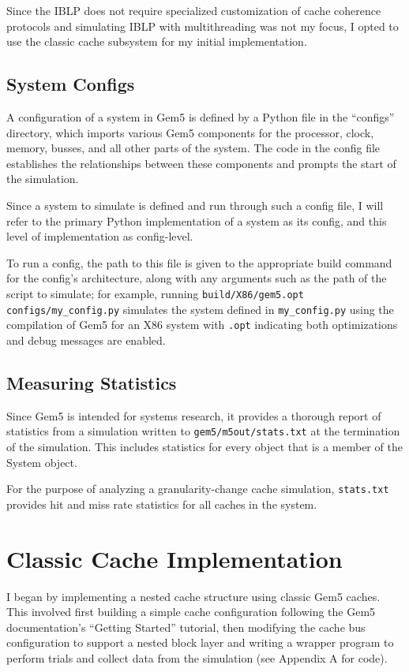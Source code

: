 \documentclass[12pt,twoside]{reedthesis}
\begin{document}
	Since the IBLP does not require specialized customization of cache coherence protocols and simulating IBLP with multithreading was not my focus, I opted to use the classic cache subsystem for my initial implementation.

	\subsection*{System Configs}

	A configuration of a system in Gem5 is defined by a Python file in the ``configs'' directory, which imports various Gem5 components for the processor, clock, memory, busses, and all other parts of the system. The code in the config file establishes the relationships between these components and prompts the start of the simulation.

	Since a system to simulate is defined and run through such a config file, I will refer to the primary Python implementation of a system as its config, and this level of implementation as config-level.

	To run a config, the path to this file is given to the appropriate build command for the config's architecture, along with any arguments such as the path of the script to simulate; for example, running \verb`build/X86/gem5.opt configs/my_config.py` simulates the system defined in \verb`my_config.py` using the compilation of Gem5 for an X86 system with \verb`.opt` indicating both optimizations and debug messages are enabled.

	\subsection*{Measuring Statistics}

	Since Gem5 is intended for systems research, it provides a thorough report of statistics from a simulation written to \verb`gem5/m5out/stats.txt` at the termination of the simulation. This includes statistics for every object that is a member of the System object.

	For the purpose of analyzing a granularity-change cache simulation, \verb`stats.txt` provides hit and miss rate statistics for all caches in the system.

\section{Classic Cache Implementation}

	I began by implementing a nested cache structure using classic Gem5 caches. This involved first building a simple cache configuration following the Gem5 documentation's ``Getting Started'' tutorial, then modifying the cache bus configuration to support a nested block layer and writing a wrapper program to perform trials and collect data from the simulation (see Appendix A for code).
\end{document}
